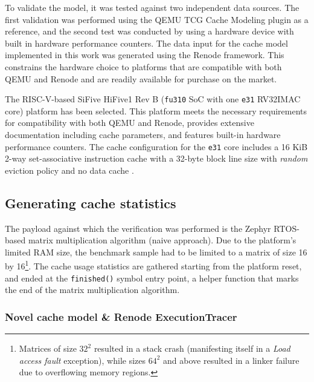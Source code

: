 To validate the model, it was tested against two independent data sources. The first validation was performed using the QEMU TCG Cache Modeling plugin as a reference, and the
second test was conducted by using a hardware device with built in hardware performance counters. The data input for the cache model implemented in this work was generated using
the Renode framework. This constrains the hardware choice to platforms that are compatible with both QEMU and Renode and are readily available for purchase on the market.

The RISC-V-based SiFive HiFive1 Rev B (\texttt{fu310} SoC with one \texttt{e31} RV32IMAC core) platform has been selected. This platform meets the necessary requirements for
compatibility with both QEMU and Renode, provides extensive documentation including cache parameters, and features built-in hardware performance counters.
The cache configuration for the \texttt{e31} core includes a 16 KiB 2-way set-associative instruction cache with a 32-byte block line size with \textit{random} eviction policy and
no data cache \cite{fe310docs}.

\subsection{Generating cache statistics}

The payload against which the verification was performed is the Zephyr RTOS-based matrix multiplication algorithm (naive approach). Due to the
platform's limited RAM size, the benchmark sample had to be limited to a matrix of size 16 by 16\footnote{Matrices of size $32^2$ resulted in a stack crash (manifesting itself in
a \textit{Load access fault} exception), while sizes $64^2$ and above resulted in a linker failure due to overflowing memory regions.}. The cache usage statistics are gathered
starting from the platform reset, and ended at the \texttt{finished()} symbol entry point, a helper function that marks the end of the matrix multiplication algorithm.

\subsubsection{Novel cache model \& Renode ExecutionTracer} %


